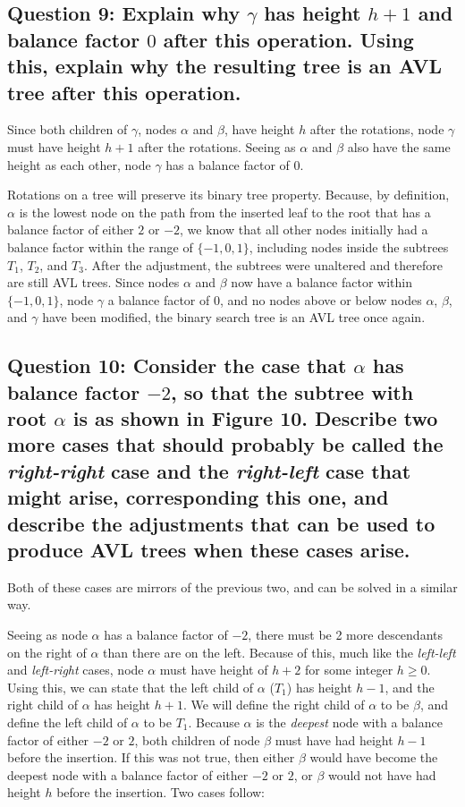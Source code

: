 \documentclass[a4paper, 12pt, titlepage]{article}
\begin{document}
\subsection*{Question 9: Explain why $\gamma$ has height $h+1$ and balance factor $0$ after this operation. Using this, explain why the resulting tree is an AVL tree after this operation.} 

Since both children of $\gamma$,
nodes $\alpha$ and $\beta$,
have height $h$ after the rotations,
node $\gamma$ must have height $h+1$ after the rotations.
Seeing as $\alpha$ and $\beta$ also have the same height as each other,
node $\gamma$ has a balance factor of $0$.

Rotations on a tree will preserve its binary tree property.
Because,
by definition,
$\alpha$ is the lowest node on the path from the inserted leaf to the root that has a balance factor of either $2$ or $-2$,
we know that all other nodes initially had a balance factor within the range of $\{-1, 0, 1\}$,
including nodes inside the subtrees $T_1$, $T_2$, and $T_3$.
After the adjustment,
the subtrees were unaltered and therefore are still AVL trees.
Since nodes $\alpha$ and $\beta$ now have a balance factor within $\{-1, 0, 1\}$,
node $\gamma$ a balance factor of $0$,
and no nodes above or below nodes $\alpha$, $\beta$, and $\gamma$ have been modified,
the binary search tree is an AVL tree once again.

\subsection*{Question 10: Consider the case that $\alpha$ has balance factor $-2$, so that the subtree with root $\alpha$ is as shown in Figure 10. Describe two more cases that should probably be called the \textit{right-right} case and the \textit{right-left} case that might arise, corresponding this one, and describe the adjustments that can be used to produce AVL trees when these cases arise.} 

Both of these cases are mirrors of the previous two,
and can be solved in a similar way.

Seeing as node $\alpha$ has a balance factor of $-2$,
there must be 2 more descendants on the right of $\alpha$ than there are on the left.
Because of this,
much like the \textit{left-left} and \textit{left-right} cases,
node $\alpha$ must have height of $h+2$ for some integer $h\geq{}0$.
Using this,
we can state that the left child of $\alpha$
($T_1$)
has height $h-1$,
and the right child of $\alpha$ has height $h+1$.
We will define the right child of $\alpha$ to be $\beta$,
and define the left child of $\alpha$ to be $T_1$.
Because $\alpha$ is the \textit{deepest} node with a balance factor of either $-2$ or $2$,
both children of node $\beta$ must have had height $h-1$ before the insertion.
If this was not true,
then either $\beta$ would have become the deepest node with a balance factor of either $-2$ or $2$,
or $\beta$ would not have had height $h$ before the insertion.
Two cases follow:
\end{document}
